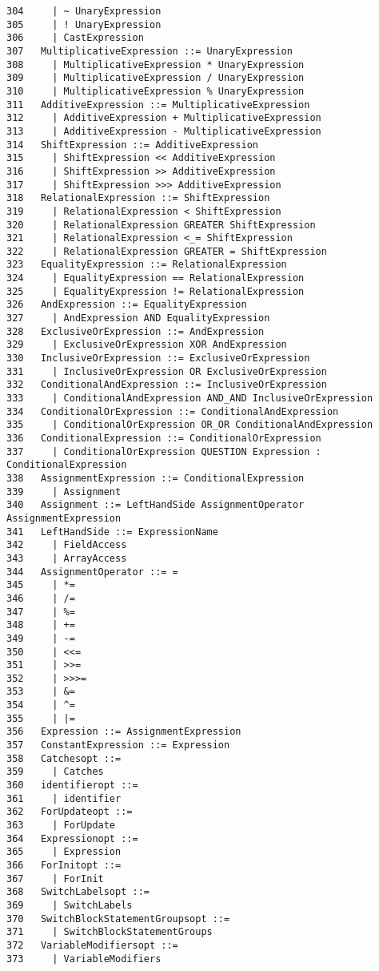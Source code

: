 {\begin{verbatim}
304     | ~ UnaryExpression
305     | ! UnaryExpression
306     | CastExpression
307   MultiplicativeExpression ::= UnaryExpression
308     | MultiplicativeExpression * UnaryExpression
309     | MultiplicativeExpression / UnaryExpression
310     | MultiplicativeExpression % UnaryExpression
311   AdditiveExpression ::= MultiplicativeExpression
312     | AdditiveExpression + MultiplicativeExpression
313     | AdditiveExpression - MultiplicativeExpression
314   ShiftExpression ::= AdditiveExpression
315     | ShiftExpression << AdditiveExpression
316     | ShiftExpression >> AdditiveExpression
317     | ShiftExpression >>> AdditiveExpression
318   RelationalExpression ::= ShiftExpression
319     | RelationalExpression < ShiftExpression
320     | RelationalExpression GREATER ShiftExpression
321     | RelationalExpression <_= ShiftExpression
322     | RelationalExpression GREATER = ShiftExpression
323   EqualityExpression ::= RelationalExpression
324     | EqualityExpression == RelationalExpression
325     | EqualityExpression != RelationalExpression
326   AndExpression ::= EqualityExpression
327     | AndExpression AND EqualityExpression
328   ExclusiveOrExpression ::= AndExpression
329     | ExclusiveOrExpression XOR AndExpression
330   InclusiveOrExpression ::= ExclusiveOrExpression
331     | InclusiveOrExpression OR ExclusiveOrExpression
332   ConditionalAndExpression ::= InclusiveOrExpression
333     | ConditionalAndExpression AND_AND InclusiveOrExpression
334   ConditionalOrExpression ::= ConditionalAndExpression
335     | ConditionalOrExpression OR_OR ConditionalAndExpression
336   ConditionalExpression ::= ConditionalOrExpression
337     | ConditionalOrExpression QUESTION Expression : ConditionalExpression
338   AssignmentExpression ::= ConditionalExpression
339     | Assignment
340   Assignment ::= LeftHandSide AssignmentOperator AssignmentExpression
341   LeftHandSide ::= ExpressionName
342     | FieldAccess
343     | ArrayAccess
344   AssignmentOperator ::= =
345     | *=
346     | /=
347     | %=
348     | +=
349     | -=
350     | <<=
351     | >>=
352     | >>>=
353     | &=
354     | ^=
355     | |=
356   Expression ::= AssignmentExpression
357   ConstantExpression ::= Expression
358   Catchesopt ::=
359     | Catches
360   identifieropt ::=
361     | identifier
362   ForUpdateopt ::=
363     | ForUpdate
364   Expressionopt ::=
365     | Expression
366   ForInitopt ::=
367     | ForInit
368   SwitchLabelsopt ::=
369     | SwitchLabels
370   SwitchBlockStatementGroupsopt ::=
371     | SwitchBlockStatementGroups
372   VariableModifiersopt ::=
373     | VariableModifiers

\end{verbatim}}
